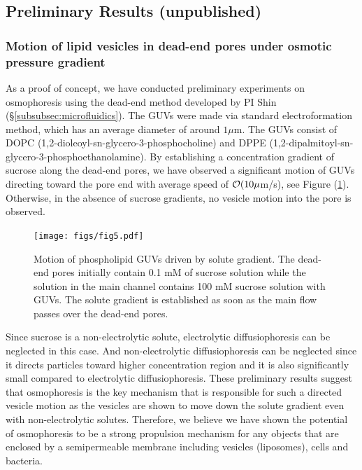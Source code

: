 \documentclass[11pt]{article}
\begin{document}
\subsection{Preliminary Results (unpublished)\label{subsec:preliminary_results}}
\subsubsection{Motion of lipid vesicles in dead-end pores under osmotic pressure gradient \label{subsubsec:osmophoresis_lipid_vesicles_deadend_pores}}
As a proof of concept, we have conducted preliminary experiments on osmophoresis using the dead-end method developed by PI Shin (\S\ref{subsubsec:microfluidics}). 
The GUVs were made via standard electroformation method, which has an average diameter of around $1 \mu$m. 
The GUVs consist of DOPC (1,2-dioleoyl-sn-glycero-3-phosphocholine) and DPPE (1,2-dipalmitoyl-sn-glycero-3-phosphoethanolamine). 
By establishing a concentration gradient of sucrose along the dead-end pores, we have observed a significant motion of GUVs directing 
toward the pore end with average speed of ${\cal O}(10 \mu$m/s), see Figure (\ref{fig:fig5}). Otherwise, in the absence of sucrose gradients, no vesicle motion into the pore is observed.
%
\begin{figure}[h]
\begin{center}
\texttt{[image: figs/fig5.pdf]}
\caption{Motion of phospholipid GUVs driven by solute gradient. The dead-end pores initially contain 0.1 mM 
of sucrose solution while the solution in the main channel contains 100 mM sucrose solution with GUVs. 
The solute gradient is established as soon as the main flow passes over the dead-end pores.}
\label{fig:fig5}
\end{center}
\end{figure}
Since sucrose is a non-electrolytic solute, electrolytic diffusiophoresis can be neglected in this case. 
And non-electrolytic diffusiophoresis can be neglected since it directs particles toward higher concentration 
region and it is also significantly small compared to electrolytic diffusiophoresis. 
These preliminary results suggest that osmophoresis is the key mechanism that is responsible for such a 
directed vesicle motion as the vesicles are shown to move down the solute gradient even with non-electrolytic solutes. 
Therefore, we believe we have shown the potential of osmophoresis to be a strong propulsion mechanism for any 
objects that are enclosed by a semipermeable membrane including vesicles (liposomes), cells and bacteria.
\end{document}
